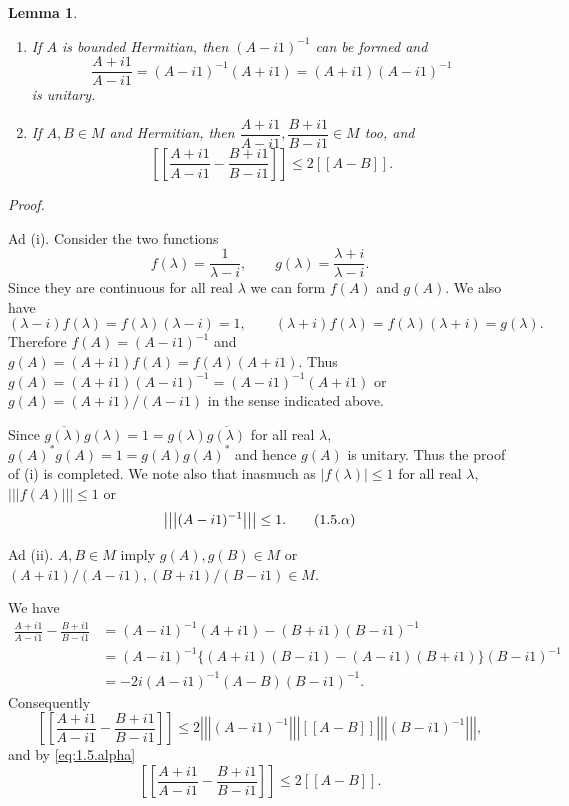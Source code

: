 \documentclass[b5paper,twoside]{article}
\theoremstyle{mvnplain}
\newtheorem{lemma}{Lemma}[section]
\renewenvironment{proof}[1][Proof]{%
  \par\addvspace{0.35\baselineskip}%
  \noindent\textit{#1.}\ \normalfont\ignorespaces
}{%
  \par\addvspace{0.35\baselineskip}%
}
\newcommand{\M}{\mathbf M}
\newcommand{\Metric}[1]{\left[\!\left[#1\right]\!\right]}
\newcommand{\OpNorm}[1]{\left\lvert\left\lvert\left\lvert#1\right\rvert\right\rvert\right\rvert}
\def\M{M}%
\def\Metric#1{[[#1]]}%
\begin{document}
\begin{lemma}\label{lem:1.5.1}
\begin{enumerate}[label=(\roman*)]
\item If $A$ is bounded Hermitian, then $(A-i1)^{-1}$ can be formed and
\[
  \frac{A+i1}{A-i1}=(A-i1)^{-1}(A+i1)=(A+i1)(A-i1)^{-1}
\]
is unitary.
\item If $A,B\in\M$ and Hermitian, then
$\dfrac{A+i1}{A-i1},\dfrac{B+i1}{B-i1}\in\M$ too, and
\[
  \Metric{\frac{A+i1}{A-i1}-\frac{B+i1}{B-i1}}
  \leq2\Metric{A-B}.
\]
\end{enumerate}
\end{lemma}
\begin{proof}
Ad (i).  Consider the two functions
\[
  f(\lambda)=\frac{1}{\lambda-i},\qquad
  g(\lambda)=\frac{\lambda+i}{\lambda-i}.
\]
Since they are continuous for all real $\lambda$ we can form $f(A)$ and $g(A)$.
We also have
\[
  (\lambda-i)f(\lambda)=f(\lambda)(\lambda-i)=1,
  \qquad
  (\lambda+i)f(\lambda)=f(\lambda)(\lambda+i)=g(\lambda).
\]
Therefore $f(A)=(A-i1)^{-1}$ and
$g(A)=(A+i1)f(A)=f(A)(A+i1)$.  Thus
$g(A)=(A+i1)(A-i1)^{-1}=(A-i1)^{-1}(A+i1)$ or
$g(A)=(A+i1)/(A-i1)$ in the sense indicated above.

Since $\overline{g(\lambda)}g(\lambda)=1=g(\lambda)\overline{g(\lambda)}$ for
all real $\lambda$, $g(A)^*g(A)=1=g(A)g(A)^*$ and hence $g(A)$ is unitary.
Thus the proof of (i) is completed.  We note also that inasmuch as
$|f(\lambda)|\leq1$ for all real $\lambda$, $\OpNorm{f(A)}\leq1$ or
\begin{equation}
  \OpNorm{(A-i1)^{-1}}\leq1.
  \tag{1.5.\ensuremath{\alpha}}\label{eq:1.5.alpha}
\end{equation}

Ad (ii).  $A,B\in\M$ imply $g(A),g(B)\in\M$ or
$(A+i1)/(A-i1),(B+i1)/(B-i1)\in\M$.

We have
\begin{align*}
  \frac{A+i1}{A-i1}-\frac{B+i1}{B-i1}
  &=(A-i1)^{-1}(A+i1)-(B+i1)(B-i1)^{-1}\\
  &=(A-i1)^{-1}\{(A+i1)(B-i1)-(A-i1)(B+i1)\}(B-i1)^{-1}\\
  &=-2i(A-i1)^{-1}(A-B)(B-i1)^{-1}.
\end{align*}
Consequently
\[
  \Metric{\frac{A+i1}{A-i1}-\frac{B+i1}{B-i1}}
  \leq2\OpNorm{(A-i1)^{-1}}\Metric{A-B}\OpNorm{(B-i1)^{-1}},
\]
and by \eqref{eq:1.5.alpha}
\[
  \Metric{\frac{A+i1}{A-i1}-\frac{B+i1}{B-i1}}
  \leq2\Metric{A-B}.
\]
\end{proof}
\end{document}
